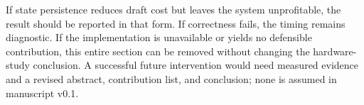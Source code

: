 If state persistence reduces draft cost but leaves the system unprofitable, the result should be reported in that form. If correctness fails, the timing remains diagnostic. If the implementation is unavailable or yields no defensible contribution, this entire section can be removed without changing the hardware-study conclusion. A successful future intervention would need measured evidence and a revised abstract, contribution list, and conclusion; none is assumed in manuscript v0.1.
